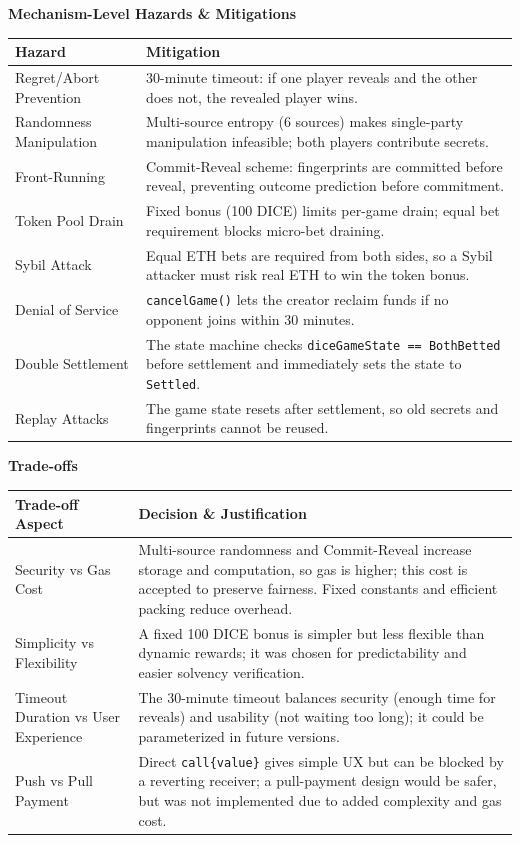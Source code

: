 \documentclass[10pt,a4paper]{article}
\begin{document}
\medskip
\textbf{Mechanism-Level Hazards \& Mitigations}

\begin{tabularx}{\textwidth}{@{}>{\raggedright\arraybackslash}p{}X@{}}
\toprule
\textbf{Hazard} & \textbf{Mitigation} \\
\midrule
Regret/Abort Prevention & 30-minute timeout: if one player reveals and the other does not, the revealed player wins. \\
Randomness Manipulation & Multi-source entropy (6 sources) makes single-party manipulation infeasible; both players contribute secrets. \\
Front-Running & Commit-Reveal scheme: fingerprints are committed before reveal, preventing outcome prediction before commitment. \\
Token Pool Drain & Fixed bonus (100 DICE) limits per-game drain; equal bet requirement blocks micro-bet draining. \\
Sybil Attack & Equal ETH bets are required from both sides, so a Sybil attacker must risk real ETH to win the token bonus. \\
Denial of Service & \texttt{cancelGame()} lets the creator reclaim funds if no opponent joins within 30 minutes. \\
Double Settlement & The state machine checks \texttt{diceGameState == BothBetted} before settlement and immediately sets the state to \texttt{Settled}. \\
Replay Attacks & The game state resets after settlement, so old secrets and fingerprints cannot be reused. \\
\bottomrule
\end{tabularx}

\medskip
\textbf{Trade-offs}

\begin{tabularx}{\textwidth}{@{}>{\raggedright\arraybackslash}p{}X@{}}
\toprule
\textbf{Trade-off Aspect} & \textbf{Decision \& Justification} \\
\midrule
Security vs Gas Cost & Multi-source randomness and Commit-Reveal increase storage and computation, so gas is higher; this cost is accepted to preserve fairness. Fixed constants and efficient packing reduce overhead. \\
Simplicity vs Flexibility & A fixed 100 DICE bonus is simpler but less flexible than dynamic rewards; it was chosen for predictability and easier solvency verification. \\
Timeout Duration vs User Experience & The 30-minute timeout balances security (enough time for reveals) and usability (not waiting too long); it could be parameterized in future versions. \\
Push vs Pull Payment & Direct \texttt{call\{value\}} gives simple UX but can be blocked by a reverting receiver; a pull-payment design would be safer, but was not implemented due to added complexity and gas cost. \\
\bottomrule
\end{tabularx}
\endgroup
\end{document}
